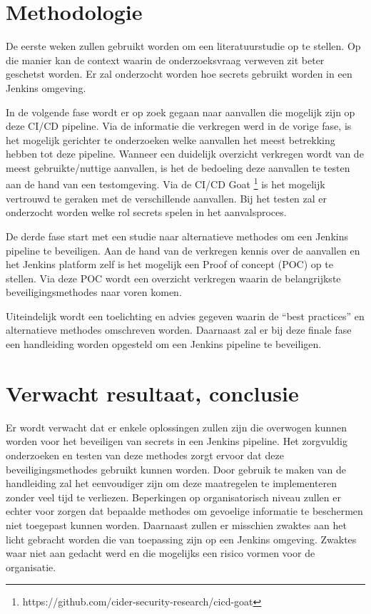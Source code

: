 \section{Methodologie}%
\label{sec:methodologie}

De eerste weken zullen gebruikt worden om een literatuurstudie op te stellen. Op die manier kan de context waarin de onderzoeksvraag verweven zit beter geschetst worden. Er zal onderzocht worden hoe secrets gebruikt worden in een Jenkins omgeving. 

In de volgende fase wordt er op zoek gegaan naar aanvallen die mogelijk zijn op deze CI/CD pipeline. Via de informatie die verkregen werd in de vorige fase, is het mogelijk gerichter te onderzoeken welke aanvallen het meest betrekking hebben tot deze pipeline.  Wanneer een duidelijk overzicht verkregen wordt van de meest gebruikte/nuttige aanvallen, is het de bedoeling deze aanvallen te testen aan de hand van een testomgeving. Via de CI/CD Goat \footnote{https://github.com/cider-security-research/cicd-goat} is het mogelijk vertrouwd te geraken met de verschillende aanvallen. Bij het testen zal er onderzocht worden welke rol secrets spelen in het aanvalsproces.  

De derde fase start met een studie naar alternatieve methodes om  een Jenkins pipeline te beveiligen. Aan de hand van de verkregen kennis over de aanvallen en het Jenkins platform zelf is het mogelijk een Proof of concept (POC) op te stellen. Via deze POC wordt een overzicht verkregen waarin de belangrijkste beveiligingsmethodes naar voren komen.

Uiteindelijk wordt een toelichting en advies gegeven waarin de “best practices” en alternatieve methodes omschreven worden. Daarnaast zal er bij deze finale fase een handleiding worden opgesteld om een Jenkins pipeline te beveiligen.


\section{Verwacht resultaat, conclusie}%
\label{sec:verwachte_resultaten}

Er wordt verwacht dat er enkele oplossingen zullen zijn die overwogen kunnen worden voor het beveiligen van secrets in een Jenkins pipeline. Het zorgvuldig onderzoeken en testen van deze methodes zorgt ervoor dat deze beveiligingsmethodes gebruikt kunnen worden. Door gebruik te maken van de handleiding zal het eenvoudiger zijn om deze maatregelen te implementeren zonder veel tijd te verliezen. Beperkingen op organisatorisch niveau zullen er echter voor zorgen dat bepaalde methodes om gevoelige informatie te beschermen niet toegepast kunnen worden. Daarnaast zullen er misschien zwaktes aan het licht gebracht worden die van toepassing zijn op een Jenkins omgeving. Zwaktes waar niet aan gedacht werd en die mogelijks een risico vormen voor de organisatie. 
